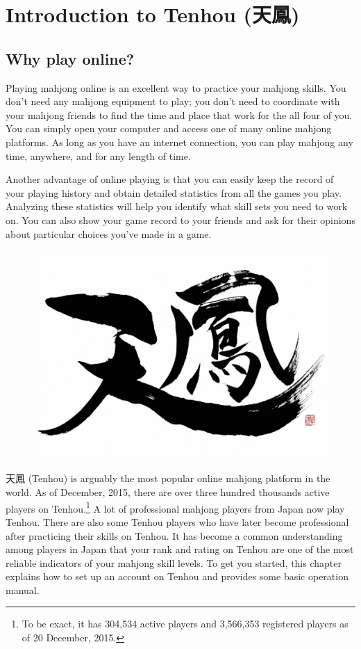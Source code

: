 
\chapter{Introduction to {\jap Tenhou} (天鳳)} \label{ch:Tenhou}
\thispagestyle{empty}

\section{Why play online?}

Playing mahjong online is an excellent way to practice your mahjong skills. You don't need any mahjong equipment to play; you don't need to coordinate with your mahjong friends to find the time and place that work for the all four of you. You can simply open your computer and access one of many online mahjong platforms. As long as you have an internet connection, you can play mahjong any time, anywhere, and for any length of time.

\bigskip
Another advantage of online playing is that you can easily keep the record of your playing history and obtain detailed statistics from all the games you play. Analyzing these statistics will help you identify what skill sets you need to work on. You can also show your game record to your friends and ask for their opinions about particular choices you've made in a game.

\begin{figure}
\vspace{-20pt}
\begin{center}
\includegraphics[width=.43\textwidth,clip]{figs/Tenhou_logo_raw_wb}
\end{center}
\vspace{-20pt}
\end{figure}

\bigskip

天鳳 ({\jap Tenhou}) is arguably the most popular online mahjong platform in the world. As of December, 2015, there are over three hundred thousands active players on {\jap Tenhou}.\footnote{To be exact, it has 304,534 active players and 3,566,353 registered players as of 20 December, 2015.} A lot of professional mahjong players from Japan now play {\jap Tenhou}. There are also some {\jap Tenhou} players who have later become professional after practicing their skills on {\jap Tenhou}. It has become a common understanding among players in Japan that your rank and rating on {\jap Tenhou} are one of the most reliable indicators of your mahjong skill levels.
To get you started, this chapter explains how to set up an account on {\jap Tenhou} and provides some basic operation manual.

